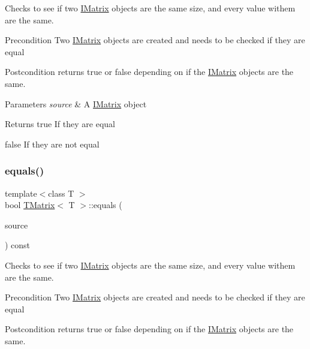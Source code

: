 Checks to see if two \mbox{\hyperlink{class_i_matrix}{I\+Matrix}} objects are the same size, and every value withem are the same. 

\begin{DoxyPrecond}{Precondition}
Two \mbox{\hyperlink{class_i_matrix}{I\+Matrix}} objects are created and needs to be checked if they are equal 
\end{DoxyPrecond}
\begin{DoxyPostcond}{Postcondition}
returns true or false depending on if the \mbox{\hyperlink{class_i_matrix}{I\+Matrix}} objects are the same.
\end{DoxyPostcond}

\begin{DoxyParams}{Parameters}
{\em source} & A \mbox{\hyperlink{class_i_matrix}{I\+Matrix}} object \\
\hline
\end{DoxyParams}
\begin{DoxyReturn}{Returns}
true If they are equal 

false If they are not equal 
\end{DoxyReturn}
\mbox{\label{class_t_matrix_ab97e94aa95695c31909158643e11bd1e}} 
\subsubsection{\texorpdfstring{equals()}{equals()}\hspace{0.1cm}{\footnotesize\ttfamily [4/6]}}
{\footnotesize\ttfamily template$<$class T $>$ \\
bool \mbox{\hyperlink{class_t_matrix}{T\+Matrix}}$<$ T $>$\+::equals (\begin{DoxyParamCaption}\item[{const \mbox{\hyperlink{class_i_matrix}{I\+Matrix}}$<$ \mbox{\hyperlink{class_u_matrix}{U\+Matrix}}$<$ T $>$, T $>$ \&}]{source }\end{DoxyParamCaption}) const}



Checks to see if two \mbox{\hyperlink{class_i_matrix}{I\+Matrix}} objects are the same size, and every value withem are the same. 

\begin{DoxyPrecond}{Precondition}
Two \mbox{\hyperlink{class_i_matrix}{I\+Matrix}} objects are created and needs to be checked if they are equal 
\end{DoxyPrecond}
\begin{DoxyPostcond}{Postcondition}
returns true or false depending on if the \mbox{\hyperlink{class_i_matrix}{I\+Matrix}} objects are the same.
\end{DoxyPostcond}

